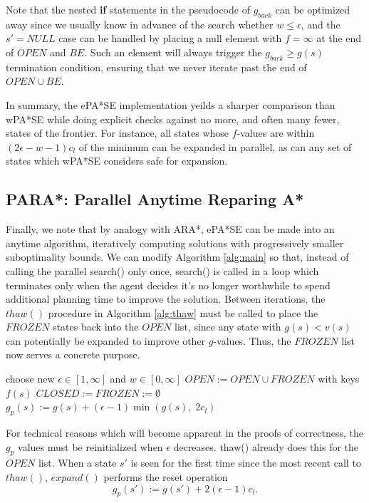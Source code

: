 \documentclass[letterpaper]{article}
\begin{document}
Note that the nested \textbf{if} statements in the pseudocode of $g_{back}$ can be optimized away since we usually know in advance of the search whether $w \le \epsilon$, and the $s' = NULL$ case can be handled by placing a null element with $f = \infty$ at the end of $OPEN$ and $BE$. Such an element will always trigger the $g_{back} \ge g(s)$ termination condition, ensuring that we never iterate past the end of $OPEN\cup BE$.

In summary, the ePA*SE implementation yeilds a sharper comparison than wPA*SE while doing explicit checks against no more, and often many fewer, states of the frontier. For instance, all states whose $f$-values are within $(2\epsilon-w-1)c_l$ of the minimum can be expanded in parallel, as can any set of states which wPA*SE considers safe for expansion.

\subsection{PARA*: Parallel Anytime Reparing A*}

Finally, we note that by analogy with ARA*, ePA*SE can be made into an anytime algorithm, iteratively computing solutions with progressively smaller suboptimality bounds. We can modify Algorithm \ref{alg:main} so that, instead of calling the parallel search() only once, search() is called in a loop which terminates only when the agent decides it's no longer worthwhile to spend additional planning time to improve the solution. Between iterations, the $thaw()$ procedure in Algorithm \ref{alg:thaw} must be called to place the $FROZEN$ states back into the $OPEN$ list, since any state with $g(s) < v(s)$ can potentially be expanded to improve other $g$-values. Thus, the $FROZEN$ list now serves a concrete purpose.

\begin{algorithm}
\caption{$thaw()$}
\label{alg:thaw}
\begin{algorithmic}
\STATE choose new $\epsilon \in [1,\infty]$ and $w \in [0,\infty]$
\STATE $OPEN := OPEN \cup FROZEN$ with keys $f(s)$
\STATE $CLOSED := FROZEN := \emptyset$
\STATE $g_p(s) := g(s) + (\epsilon-1)\min(g(s),\;2c_l)$
\ENDFOR
\end{algorithmic}
\end{algorithm}

For technical reasons which will become apparent in the proofs of correctness, the $g_p$ values must be reinitialized when $\epsilon$ decreases. thaw() already does this for the $OPEN$ list. When a state $s'$ is seen for the first time since the most recent call to $thaw()$, $expand()$ performs the reset operation
\[g_p(s') := g(s') + 2(\epsilon-1)c_l.\]
\end{document}
